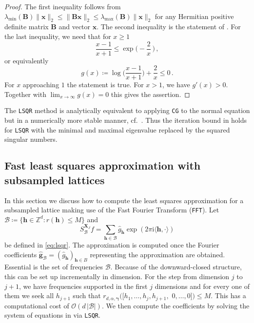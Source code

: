 \documentclass[a4paper]{amsart}
\renewcommand{\hat}{\widehat}
\begin{document}
\begin{proof} The first inequality follows from $\lambda_{\min}(\bm B)\|\bm x\|_2 \le \|\bm B\bm x\|_2 \le \lambda_{\max}(\bm B)\|\bm x\|_2$ for any Hermitian positive definite matrix $\bm B$ and vector $\bm x$.
    The second inequality is the statement of \cite[Theorem~3.1.1]{Gre97}.
    For the last inequality, we need that for $x\ge 1$
    \begin{equation*}
        \frac{x-1}{x+1} \le \exp\Big(\!-\frac 2x\,\Big) \,,
    \end{equation*}
    or equivalently
    \begin{equation*}
        g(x) \coloneqq \log \Big(\frac{x-1}{x+1}\Big) + \frac 2x \le 0 \,.
    \end{equation*}
    For $x$ approaching $1$ the statement is true.
    For $x>1$, we have $g'(x) > 0$.
    Together with $\lim_{x\to\infty}g(x) = 0$ this gives the assertion.
\end{proof} 

The \texttt{LSQR} method is analytically equivalent to applying \texttt{CG} to the normal equation but in a numerically more stable manner, cf.\ \cite{PS82}.
Thus the iteration bound in  holds for \texttt{LSQR} with the minimal and maximal eigenvalue replaced by the squared singular numbers.



\subsection{Fast least squares approximation with subsampled lattices}\label{sec:ilsqr}


In this section we discuss how to compute the least squares approximation for a subsampled lattice making use of the Fast Fourier Transform (\texttt{FFT}).
Let $\mathcal B \coloneqq \{\bm h\in\mathds Z^d : r(\bm h)\le M\}$ and
\begin{equation*}
    S_{\mathcal B}^{\bm X_J}f
    = \sum_{\bm h\in\mathcal B}\hat g_{\bm h} \exp(2\pi\mathrm i\langle\bm h,\cdot\rangle)
\end{equation*}
be defined in \eqref{eq:lsqr}.
The approximation is computed once the Fourier coefficients $\bm{\hat g}_{\mathcal B} = (\hat g_{\bm h})_{\bm h\in B}$ representing the approximation are obtained.
Essential is the set of frequencies $\mathcal B$.
Because of the downward-closed structure, this can be set up incrementally in dimension.
For the step from dimension $j$ to $j+1$, we have frequencies supported in the first $j$ dimensions and for every one of them we seek all $h_{j+1}$ such that $r_{d,\alpha,\bm\gamma}([h_1, \dots, h_j, h_{j+1},$ $ 0, \dots, 0]) \le M$.
This has a computational cost of $\mathcal O(d\,|\mathcal B|)$.
We then compute the coefficients by solving the system of equations in  via \texttt{LSQR}.
\end{document}
